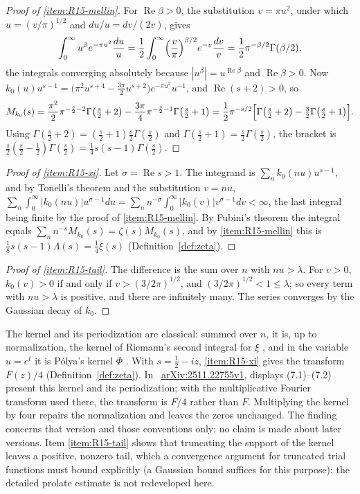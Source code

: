 \documentclass[11pt]{amsart}
\theoremstyle{plain}
\theoremstyle{definition}
\theoremstyle{remark}
\numberwithin{equation}{section}
\newcommand{\arxivlink}[2]{\cite{#1}\,%
  \href{https://arxiv.org/abs/#2}{\textsf{arXiv:#2}}}
\DeclareMathOperator{\Rea}{Re}
\renewcommand{\Re}{\Rea}
\begin{document}
\begin{proof}[Proof of \ref{item:R15-mellin}]
For $\Re\beta>0$, the substitution $v=\pi u^2$, under which
$u=(v/\pi)^{1/2}$ and $du/u=dv/(2v)$, gives
\[
\int_0^\infty u^{\beta}e^{-\pi u^2}\frac{du}u
=\frac12\int_0^\infty\Bigl(\frac v\pi\Bigr)^{\beta/2}e^{-v}\frac{dv}v
=\frac12\pi^{-\beta/2}\Gamma(\beta/2),
\]
the integrals converging absolutely because
$|u^\beta|=u^{\Re\beta}$ and $\Re\beta>0$. Now
$k_0(u)u^{s-1}=\bigl(\pi^2u^{s+4}-\tfrac{3\pi}2u^{s+2}\bigr)
e^{-\pi u^2}u^{-1}$, and $\Re(s+2)>0$, so
\[
M_{k_0}(s)=\frac{\pi^2}2\pi^{-\frac s2-2}\Gamma\bigl(\tfrac s2+2\bigr)
-\frac{3\pi}4\pi^{-\frac s2-1}\Gamma\bigl(\tfrac s2+1\bigr)
=\frac12\pi^{-s/2}\Bigl[\Gamma\bigl(\tfrac s2+2\bigr)
-\tfrac32\Gamma\bigl(\tfrac s2+1\bigr)\Bigr].
\]
Using $\Gamma(\tfrac s2+2)=(\tfrac s2+1)\tfrac s2\Gamma(\tfrac s2)$ and
$\Gamma(\tfrac s2+1)=\tfrac s2\Gamma(\tfrac s2)$, the bracket is
$\tfrac s2(\tfrac s2-\tfrac12)\Gamma(\tfrac s2)=\tfrac14s(s-1)
\Gamma(\tfrac s2)$.
\end{proof}

\begin{proof}[Proof of \ref{item:R15-xi}]
Let $\sigma=\Re s>1$. The integrand is
$\sum_nk_0(nu)u^{s-1}$, and by Tonelli's theorem and the substitution
$v=nu$,
$\sum_n\int_0^\infty|k_0(nu)|u^{\sigma-1}du=\sum_nn^{-\sigma}
\int_0^\infty|k_0(v)|v^{\sigma-1}dv<\infty$, the last integral being finite
by the proof of \ref{item:R15-mellin}. By Fubini's theorem the integral
equals $\sum_nn^{-s}M_{k_0}(s)=\zeta(s)M_{k_0}(s)$, and by
\ref{item:R15-mellin} this is
$\tfrac18s(s-1)\Lambda(s)=\tfrac14\xi(s)$ (Definition~\ref{def:zeta}).
\end{proof}

\begin{proof}[Proof of \ref{item:R15-tail}]
The difference is the sum over $n$ with $nu>\lambda$. For $v>0$,
$k_0(v)>0$ if and only if $v>(3/2\pi)^{1/2}$, and $(3/2\pi)^{1/2}<1\le
\lambda$; so every term with $nu>\lambda$ is positive, and there are
infinitely many. The series converges by the Gaussian decay of $k_0$.
\end{proof}

The kernel and its periodization are classical: summed over $n$, it is,
up to normalization, the kernel of Riemann's second integral for $\xi$
\cite[p.~4]{Riemann1859Wilkins}, and in the variable $u=e^t$ it is
P\'olya's kernel $\Phi$ \cite[(7.2)--(7.3), p.~220]{DeBruijn1950Roots}.
With $s=\tfrac12-iz$, \ref{item:R15-xi} gives the transform $F(z)/4$
(Definition~\ref{def:zeta}). In
\arxivlink{ConnesConsaniMoscovici2025ZetaTriples}{2511.22755v1},
displays (7.1)--(7.2) present this kernel and its periodization; with the
multiplicative Fourier transform used there, the transform is $F/4$
rather than $F$. Multiplying the kernel by four repairs the
normalization and leaves the zeros unchanged. The finding concerns that
version and those conventions only; no claim is made about later
versions. Item \ref{item:R15-tail} shows that truncating the support of
the kernel leaves a positive, nonzero tail, which a convergence argument
for truncated trial functions must bound explicitly (a Gaussian bound
suffices for this purpose); the detailed prolate estimate is not
redeveloped here.
\end{document}
